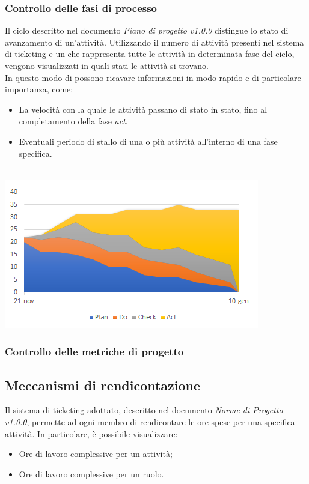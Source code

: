 \subsubsection{Controllo delle fasi di processo}
Il ciclo  descritto nel documento \emph{Piano di progetto v1.0.0} distingue lo stato di avanzamento di un'attività. Utilizzando il numero di attività presenti nel sistema di ticketing e un  che rappresenta tutte le attività in determinata fase del ciclo, vengono visualizzati in quali stati le attività si trovano. \\
In questo modo di possono ricavare informazioni in  modo rapido e di particolare importanza, come:
\begin{itemize}
\item{La velocità con la quale le attività passano di stato in stato, fino al completamento della fase \emph{act}.}
\item{Eventuali periodo di stallo di una o più attività all'interno di una fase specifica.} \\ \\
\end{itemize}  
\centerline {\includegraphics[scale=1]{../PianoDiProgetto/Img/Grafico_PDCA.png}}
\subsubsection{Controllo delle metriche di progetto}


\subsection{Meccanismi di rendicontazione}
Il sistema di ticketing adottato, descritto nel documento \emph{Norme di Progetto v1.0.0}, permette ad ogni membro di rendicontare le ore spese per una specifica attività. In particolare, è possibile visualizzare:
\begin{itemize}
\item{Ore di lavoro complessive per un attività;}
\item{Ore di lavoro complessive per un ruolo.}
\end{itemize}
\pagebreak